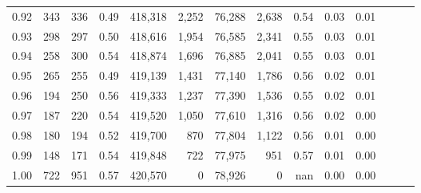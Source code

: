 \begin{tabular}{rrrrrrrrrrrrrr}
0.92 &    343 &    336 &  0.49 &  418,318 &    2,252 &  76,288 &   2,638 &  0.54 &  0.03 &      0.01 \\
0.93 &    298 &    297 &  0.50 &  418,616 &    1,954 &  76,585 &   2,341 &  0.55 &  0.03 &      0.01 \\
0.94 &    258 &    300 &  0.54 &  418,874 &    1,696 &  76,885 &   2,041 &  0.55 &  0.03 &      0.01 \\
0.95 &    265 &    255 &  0.49 &  419,139 &    1,431 &  77,140 &   1,786 &  0.56 &  0.02 &      0.01 \\
0.96 &    194 &    250 &  0.56 &  419,333 &    1,237 &  77,390 &   1,536 &  0.55 &  0.02 &      0.01 \\
0.97 &    187 &    220 &  0.54 &  419,520 &    1,050 &  77,610 &   1,316 &  0.56 &  0.02 &      0.00 \\
0.98 &    180 &    194 &  0.52 &  419,700 &      870 &  77,804 &   1,122 &  0.56 &  0.01 &      0.00 \\
0.99 &    148 &    171 &  0.54 &  419,848 &      722 &  77,975 &     951 &  0.57 &  0.01 &      0.00 \\
1.00 &    722 &    951 &  0.57 &  420,570 &        0 &  78,926 &       0 &   nan &  0.00 &      0.00 \\
\bottomrule
\end{tabular}
